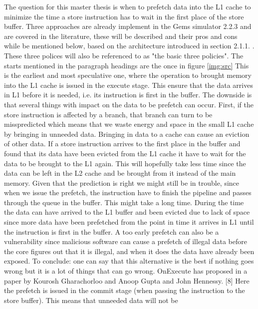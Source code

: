 The question for this master thesis is when to prefetch data into the L1 cache to
minimize the time a store instruction has to wait in the first place of the store buffer.
Three approaches are already implement in the Gems simulator 2.2.3 \fixme and are covered in the literature,  these will
be described and their pros and cons while be mentioned below, based on the architecture
introduced in section 2.1.1. \fixme. These three polices will also be referenced to as "the basic three policies". The starts mentioned in the paragraph headings
are the once in figure \ref{img:src}
 This is the earliest and most speculative one, where the
operation to brought memory into the L1 cache is issued in the execute stage. This
ensure that the data arrives in L1 before it is needed, i.e. its instruction is first in the
buffer. The downside is that several things with impact on the data to be prefetch can
occur. First, if the store instruction is affected by a branch, that branch can turn to
be misspredicted which means that we waste energy and space in the small L1 cache
by bringing in unneeded data. Bringing in data to a cache can cause an eviction of
other data. If a store instruction arrives to the first place in the buffer and found that
its data have been evicted from the L1 cache it have to wait for the data to be brought
to the L1 again. This will hopefully take less time since the data can be left in the L2
cache and be brought from it instead of the main memory. Given that the prediction
is right we might still be in trouble, since when we issue the prefetch, the instruction
have to finish the pipeline and passes through the queue in the buffer. This might
take a long time. During the time the data can have arrived to the L1 buffer and been
evicted due to lack of space since more data have been prefetched from the point in
time it arrives in L1 until the instruction is first in the buffer. A too early prefetch
can also be a vulnerability since malicious software can cause a prefetch of illegal data
before the core figures out that it is illegal, and when it does the data have already
been exposed. To conclude: one can say that this alternative is the best if nothing
goes wrong but it is a lot of things that can go wrong. OnExecute has proposed in a
paper by Kourosh Gharachorloo and Anoop Gupta and John Hennessy. [8]\fixme
{} Here the prefetch is issued in the commit stage (when passing
the instruction to the store buffer). This means that unneeded data will not be
